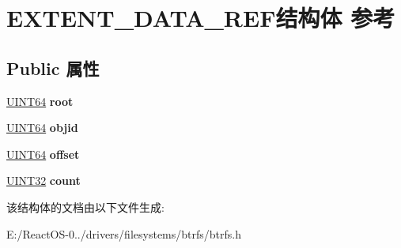 \hypertarget{struct_e_x_t_e_n_t___d_a_t_a___r_e_f}{}\section{E\+X\+T\+E\+N\+T\+\_\+\+D\+A\+T\+A\+\_\+\+R\+E\+F结构体 参考}
\label{struct_e_x_t_e_n_t___d_a_t_a___r_e_f}
\subsection*{Public 属性}
\begin{DoxyCompactItemize}
\item 
\mbox{\label{struct_e_x_t_e_n_t___d_a_t_a___r_e_f_a0d448da97694d420e02c8693928ad3a3}} 
\hyperlink{_processor_bind_8h_a57be03562867144161c1bfee95ca8f7c}{U\+I\+N\+T64} {\bfseries root}
\item 
\mbox{\label{struct_e_x_t_e_n_t___d_a_t_a___r_e_f_a13064b554b762f061be063763887c66e}} 
\hyperlink{_processor_bind_8h_a57be03562867144161c1bfee95ca8f7c}{U\+I\+N\+T64} {\bfseries objid}
\item 
\mbox{\label{struct_e_x_t_e_n_t___d_a_t_a___r_e_f_af169a6714f2818361bce8735ec520c18}} 
\hyperlink{_processor_bind_8h_a57be03562867144161c1bfee95ca8f7c}{U\+I\+N\+T64} {\bfseries offset}
\item 
\mbox{\label{struct_e_x_t_e_n_t___d_a_t_a___r_e_f_a6a39908ec5d22fa6375689b0254372ad}} 
\hyperlink{_processor_bind_8h_ae1e6edbbc26d6fbc71a90190d0266018}{U\+I\+N\+T32} {\bfseries count}
\end{DoxyCompactItemize}


该结构体的文档由以下文件生成\+:\begin{DoxyCompactItemize}
\item 
E\+:/\+React\+O\+S-\/0../drivers/filesystems/btrfs/btrfs.\+h\end{DoxyCompactItemize}

